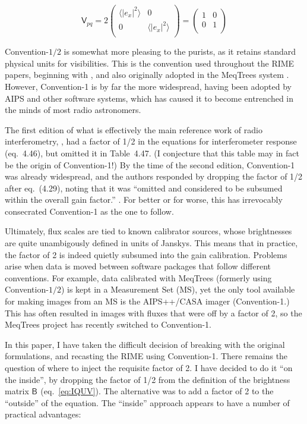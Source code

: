 \documentclass[]{aa}
\newcommand{\matrixtt}[4]{\left( \begin{array}{cc}#1&#2\\#3&#4\\\end{array} \right)}
\newcommand{\coh}[2]{\mathsf{{#1}}_{{#2}}}
\begin{document}
\[
\coh{V}{pq} = 2\matrixtt{\langle |e_x|^2\rangle }{0}{0}{\langle |e_x|^2\rangle } = \matrixtt{1}{0}{0}{1}
\]

Convention-$\scriptstyle 1/2$ is somewhat more pleasing to the purists, as it retains standard physical units for visibilities. This is the convention used throughout the RIME papers, beginning with \citet{ME1}, and also originally adopted in the MeqTrees system \citep{meqtrees}. However, Convention-1 is by far the more widespread, having been adopted by AIPS and other software systems, which has caused it to become entrenched in the minds of most radio astronomers.

The first edition of what is effectively the main reference work of radio interferometry, \citet*{tms1}, had a factor of 1/2 in the equations for interferometer response (eq.~4.46), but omitted it in Table~4.47. (I conjecture that this table may in fact be the origin of Convention-1!) By the time of the second edition, Convention-1 was already widespread, and the authors responded by dropping the factor of 1/2 after eq.~(4.29), noting that it was ``omitted and considered to be subsumed within the overall gain factor.'' \citep[see p. 102]{tms}. For better or for worse, this has irrevocably consecrated Convention-1 as the one to follow.

Ultimately, flux scales are tied to known calibrator sources, whose brightnesses are quite unambigously defined in units of Janskys. This means that in practice, the factor of 2 is indeed quietly subsumed into the gain calibration. Problems arise when data is moved between software packages that follow different conventions. For example, data calibrated with MeqTrees (formerly using  Convention-$\scriptstyle 1/2$) is kept in a Measurement Set (MS), yet the only tool available for making images from an MS is the AIPS++/CASA imager (Convention-1.) This has often resulted in images with fluxes that were off by a factor of 2, so the MeqTrees project has recently switched to Convention-1.

In this paper, I have taken the difficult decision of breaking with the original formulations, and recasting the RIME using Convention-1. There remains the question of where to inject the requisite factor of 2. I have decided to do it ``on the inside'', by dropping the factor of 1/2 from the \citet{ME4} definition of the brightness matrix $\coh{B}{}$ (eq.~\ref{eq:IQUV}). The alternative was to add a factor of 2 to the ``outside'' of the equation. The ``inside'' approach appears to have a number of practical advantages:
\end{document}
